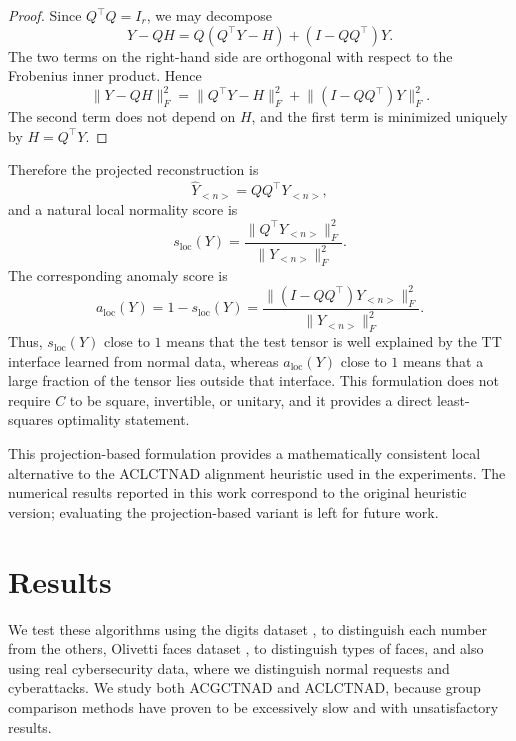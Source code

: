 \documentclass{article}
\begin{document}
\begin{proof}
Since $Q^\top Q=I_r$, we may decompose
\[
    Y-QH
    =
    Q(Q^\top Y-H) + (I-QQ^\top)Y.
\]
The two terms on the right-hand side are orthogonal with respect to the
Frobenius inner product. Hence
\[
    \lVert Y-QH\rVert_F^2
    =
    \lVert Q^\top Y-H\rVert_F^2
    +
    \lVert (I-QQ^\top)Y\rVert_F^2.
\]
The second term does not depend on $H$, and the first term is minimized
uniquely by $H=Q^\top Y$.
\end{proof}

Therefore the projected reconstruction is
\begin{equation}
    \hat Y_{<n>} = QQ^\top Y_{<n>},
\end{equation}
and a natural local normality score is
\begin{equation}
    s_{\mathrm{loc}}(Y)=\frac{\lVert Q^\top Y_{<n>}\rVert_F^2}{\lVert Y_{<n>}\rVert_F^2}.
\end{equation}
The corresponding anomaly score is
\begin{equation}
    a_{\mathrm{loc}}(Y)=1-s_{\mathrm{loc}}(Y)=\frac{\lVert (I-QQ^\top)Y_{<n>}\rVert_F^2}{\lVert Y_{<n>}\rVert_F^2}.
\end{equation}
Thus, $s_{\mathrm{loc}}(Y)$ close to $1$ means that the test tensor is well explained by the TT interface learned from normal data, whereas $a_{\mathrm{loc}}(Y)$ close to $1$ means that a large fraction of the tensor lies outside that interface. This formulation does not require $C$ to be square, invertible, or unitary, and it provides a direct least-squares optimality statement.

This projection-based formulation provides a mathematically consistent local alternative to the ACLCTNAD alignment heuristic used in the experiments. The numerical results reported in this work correspond to the original heuristic version; evaluating the projection-based variant is left for future work.

\section{Results}
We test these algorithms using the digits dataset \cite{Digits}, to distinguish each number from the others, Olivetti faces dataset \cite{Olivetti}, to distinguish types of faces, and also using real cybersecurity data, where we distinguish normal requests and cyberattacks. We study both ACGCTNAD and ACLCTNAD, because group comparison methods have proven to be excessively slow and with unsatisfactory results.
\end{document}

